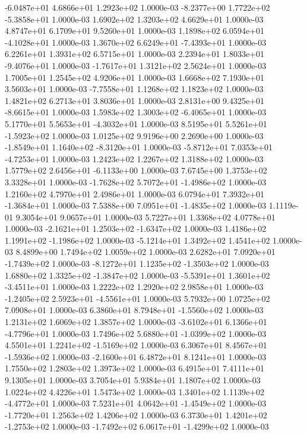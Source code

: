 -6.0487e+01  4.6866e+01  1.2923e+02  1.0000e-03
-8.2377e+00  1.7722e+02 -5.3858e+01  1.0000e-03
1.6902e+02 1.3203e+02 4.6629e+01  1.0000e-03
4.8747e+01 6.1709e+01 9.5260e+01  1.0000e-03
 1.1898e+02  6.0594e+01 -4.1028e+01  1.0000e-03
 1.3670e+02  6.6249e+01 -7.4393e+01  1.0000e-03
6.2261e+01 1.3931e+02 6.5715e+01  1.0000e-03
 2.2394e+01  1.8033e+01 -9.4076e+01  1.0000e-03
-1.7617e+01  1.3121e+02  2.5624e+01  1.0000e-03
1.7005e+01 1.2545e+02 4.9206e+01  1.0000e-03
1.6668e+02 7.1930e+01 3.5603e+01  1.0000e-03
-7.7558e+01  1.1268e+02  1.1823e+02  1.0000e-03
1.4821e+02 6.2713e+01 3.8036e+01  1.0000e-03
 2.8131e+00  9.4325e+01 -8.6615e+01  1.0000e-03
 1.5983e+02  1.3003e+02 -6.4065e+01  1.0000e-03
 5.1770e+01  5.5653e+01 -4.3032e+01  1.0000e-03
 8.5195e+01  5.5261e+01 -1.5923e+02  1.0000e-03
1.0125e+02 9.9196e+00 2.2690e+00  1.0000e-03
-1.8549e+01  1.1640e+02 -8.3120e+01  1.0000e-03
-5.8712e+01  7.0353e+01 -4.7253e+01  1.0000e-03
1.2423e+02 1.2267e+02 1.3188e+02  1.0000e-03
 1.5779e+02  2.6456e+01 -6.1133e+00  1.0000e-03
7.6745e+00 1.3753e+02 3.3328e+01  1.0000e-03
-1.7628e+02  5.7072e+01 -1.4986e+02  1.0000e-03
1.2160e+02 4.7970e+01 2.4986e+01  1.0000e-03
 6.0794e+01  7.3932e+01 -1.3684e+01  1.0000e-03
 7.5388e+00  7.0951e+01 -1.4835e+02  1.0000e-03
1.1119e-01 9.3054e+01 9.0657e+01  1.0000e-03
5.7227e+01 1.3368e+02 4.0778e+01  1.0000e-03
-2.1621e+01  1.2503e+02 -1.6347e+02  1.0000e-03
 1.4186e+02  1.1991e+02 -1.1986e+02  1.0000e-03
-5.1214e+01  1.3492e+02  1.4541e+02  1.0000e-03
8.4899e+00 1.7494e+02 1.0059e+02  1.0000e-03
 2.6282e+01  7.0920e+01 -1.7439e+02  1.0000e-03
-8.1272e+01  1.1235e+02 -1.3503e+02  1.0000e-03
 1.6880e+02  1.3325e+02 -1.3847e+02  1.0000e-03
-5.5391e+01  1.3601e+02 -3.4511e+01  1.0000e-03
1.2222e+02 1.2920e+02 2.9858e+01  1.0000e-03
-1.2405e+02  2.5923e+01 -4.5561e+01  1.0000e-03
5.7932e+00 1.0725e+02 7.0908e+01  1.0000e-03
 6.3860e+01  8.7948e+01 -1.5560e+02  1.0000e-03
1.2131e+02 1.6069e+02 1.3857e+02  1.0000e-03
-3.6102e+01  6.1366e+01 -4.7796e+01  1.0000e-03
 1.7496e+02  5.6880e+01 -1.0399e+02  1.0000e-03
 4.5501e+01  1.2241e+02 -1.5169e+02  1.0000e-03
 6.3067e+01  8.4567e+01 -1.5936e+02  1.0000e-03
-2.1600e+01  6.4872e+01  8.1241e+01  1.0000e-03
1.7550e+02 1.2803e+02 1.3973e+02  1.0000e-03
6.4915e+01 7.4111e+01 9.1305e+01  1.0000e-03
3.7054e+01 5.9384e+01 1.1807e+02  1.0000e-03
1.0224e+02 4.4226e+01 1.5473e+02  1.0000e-03
 1.3401e+02  1.1139e+02 -4.4772e+01  1.0000e-03
 7.5231e+01  4.0642e+01 -1.4549e+02  1.0000e-03
-1.7720e+01  1.2563e+02  1.4206e+02  1.0000e-03
 6.3730e+01  1.4201e+02 -1.2753e+02  1.0000e-03
-1.7492e+02  6.0617e+01 -1.4299e+02  1.0000e-03
